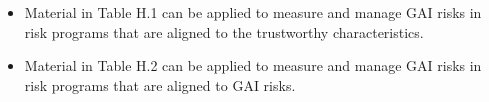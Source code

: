 \documentclass[fleqn]{article}
\begin{document}
\begin{landscape}
\begin{itemize}
	\item Material in Table H.1 can be applied to measure and manage GAI risks in risk programs that are aligned to the trustworthy characteristics. 
	\item Material in Table H.2 can be applied to measure and manage GAI risks in risk programs that are aligned to GAI risks. 
\end{itemize}
 
\vfill
\raisebox{-10pt}{\makebox[\linewidth]{\thepage}}

\end{landscape}
\end{document}
